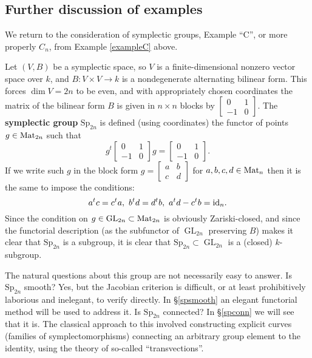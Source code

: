 \documentclass[10pt]{article}
\newcommand{\GL}{\operatorname{GL}}
\renewcommand{\(}{\left(}
\renewcommand{\)}{\right)}
\newcommand{\Sp}{\mathrm{Sp}}
\numberwithin{thm}{subsection}
\begin{document}
\subsection{Further discussion of examples}
\begin{ex}[$C_n$]\label{exampleCn}
We return to the consideration of symplectic groups,
Example ``C'', or more properly $C_n$,  from Example \ref{exampleC} above.

Let $(V,B)$ be a symplectic space, so $V$ is a finite-dimensional nonzero vector space
over $k$, and $B:V\times V\to k$ is a nondegenerate alternating bilinear form.
This forces $\dim V=2n$ to be even,
and with appropriately chosen coordinates the matrix
of the bilinear form $B$ is given in $n\times n$ blocks
by $\left[\begin{smallmatrix}0&1\\-1&0\end{smallmatrix}\right]$.
The \textbf{symplectic group} $\Sp_{2n}$ is defined (using coordinates) the functor of points
$g\in {\rm{Mat}}_{2n}$ such that 
$$g^t\left[\begin{smallmatrix}0&1\\-1&0\end{smallmatrix}\right]g=\left[\begin{smallmatrix}0&1\\-1&0\end{smallmatrix}\right].$$
If we write such $g$ in the block form 
$g = \left[\begin{smallmatrix}a&b\\c&d\end{smallmatrix}\right]$ for $a,b,c,d\in {\rm{Mat}}_n$ then it is the same to impose the conditions:
$$a^tc=c^ta, \,\, b^td=d^tb, \,\, a^td-c^tb= {\rm{id}}_n.$$
Since the condition on $g\in \GL_{2n}\subset {\rm{Mat}}_{2n}$ is obviously Zariski-closed, and since the functorial description (as the subfunctor of $\GL_{2n}$ preserving $B$) makes it clear that $\Sp_{2n}$ is a subgroup,
it is clear that $\Sp_{2n}\subset \GL_{2n}$ is a (closed) $k$-subgroup.

The natural questions about this group are not necessarily easy to answer.
Is $\Sp_{2n}$ smooth? Yes, but the Jacobian criterion is difficult, or at least prohibitively laborious and inelegant, to verify directly. In \S\ref{spsmooth} an elegant functorial method will be used to address it.
Is $\Sp_{2n}$ connected? In 
\S\ref{spconn} we will see that it is. The classical approach to this involved constructing explicit curves (families of symplectomorphisms) connecting an arbitrary group element to the identity, using the theory of so-called ``transvections''.
\end{ex}
\end{document}
